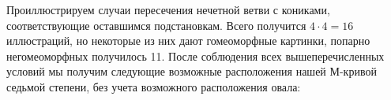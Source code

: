 \documentclass[14pt]{article}
\begin{document}
\begin{figure}[H]
\caption{}
\label{fig:prohibit_3_case_loc_odd_brunch}
\end{figure}


Проиллюстрируем случаи пересечения нечетной ветви с кониками, соответствующие оставшимся подстановкам. Всего получится $4 \cdot 4 = 16$ иллюстраций, но некоторые из них дают гомеоморфные картинки, попарно негомеоморфных получилось 11. 
После соблюдения всех вышеперечисленных условий мы получим следующие возможные расположения нашей М-кривой седьмой степени, без учета возможного расположения овала:
\end{document}
